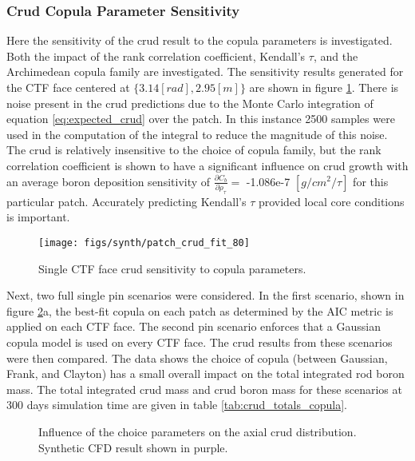 \subsubsection{Crud Copula Parameter Sensitivity}
\label{sec:crud_copula_sensi}

Here the sensitivity of the crud result to the copula parameters is investigated.  Both the impact of the rank correlation coefficient, Kendall's $\tau$, and the Archimedean copula family are investigated.  The sensitivity results generated for the CTF face centered at $\{3.14[rad], 2.95[m]\}$ are shown in figure \ref{fig:patchcrudfit80}.  There is noise present in the crud predictions due to the Monte Carlo integration of equation \ref{eq:expected_crud} over the patch.  In this instance 2500 samples were used in the computation of the integral to reduce the magnitude of this noise.  The crud is relatively insensitive to the choice of copula family, but the rank correlation coefficient is shown to have a significant influence on crud growth with an average boron deposition sensitivity of $\frac{\partial C_b}{\partial \rho_\tau} =$ -1.086e-7 $[g/cm^2/\tau]$ for this particular patch.  Accurately predicting Kendall's $\tau$ provided local core conditions is important.

\begin{figure}[H]
    \centering
    \texttt{[image: figs/synth/patch\_crud\_fit\_80]}
    \caption{Single CTF face crud sensitivity to copula parameters.}
    \label{fig:patchcrudfit80}
\end{figure}

Next, two full single pin scenarios were considered. In the first scenario, shown in figure \ref{fig:crud_copula_fam_sensi}a, the best-fit copula on each patch as determined by the AIC metric is applied on each CTF face.  The second pin scenario enforces that a Gaussian copula model is used on every CTF face.  The crud results from these scenarios were then compared.  The data shows the choice of copula (between Gaussian, Frank, and Clayton) has a small overall impact on the total integrated rod boron mass.   The total integrated crud mass and crud boron mass for these scenarios at 300 days simulation time are given in table \ref{tab:crud_totals_copula}.

\begin{figure}[H]%
    \centering
    \hspace*{-1.0em}%
    \caption[Influence of the choice parameters on the axial crud distribution.]{Influence of the choice parameters on the axial crud distribution.  Synthetic CFD result shown in purple.}%
    \label{fig:crud_copula_fam_sensi}%
\end{figure}


